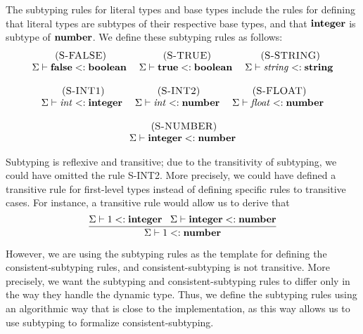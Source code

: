 The subtyping rules for literal types and base types include the rules
for defining that literal types are subtypes of their respective base types,
and that $\mathbf{integer}$ is subtype of $\mathbf{number}$.
We define these subtyping rules as follows:
\[
\begin{array}{c}
\begin{array}{c}
\; (\textsc{S-FALSE})\\
\Sigma \vdash \mathbf{false} <: \mathbf{boolean}
\end{array}
\;
\begin{array}{c}
\; (\textsc{S-TRUE})\\
\Sigma \vdash \mathbf{true} <: \mathbf{boolean}
\end{array}
\;
\begin{array}{c}
\; (\textsc{S-STRING})\\
\Sigma \vdash {\it string} <: \mathbf{string}
\end{array}
\\ \\
\begin{array}{c}
\; (\textsc{S-INT1})\\
\Sigma \vdash {\it int} <: \mathbf{integer}
\end{array}
\;
\begin{array}{c}
\; (\textsc{S-INT2})\\
\Sigma \vdash {\it int} <: \mathbf{number}
\end{array}
\;
\begin{array}{c}
\; (\textsc{S-FLOAT})\\
\Sigma \vdash {\it float} <: \mathbf{number}
\end{array}
\\ \\
\begin{array}{c}
\; (\textsc{S-NUMBER})\\
\Sigma \vdash \mathbf{integer} <: \mathbf{number}
\end{array}
\end{array}
\]

Subtyping is reflexive and transitive;
due to the transitivity of subtyping, we could have omitted the rule \textsc{S-INT2}.
More precisely, we could have defined a transitive rule for first-level
types instead of defining specific rules to transitive cases.
For instance, a transitive rule would allow us to derive that
\[
\dfrac{\Sigma \vdash 1 <: \mathbf{integer} \;\;\;
       \Sigma \vdash \mathbf{integer} <: \mathbf{number}}
      {\Sigma \vdash 1 <: \mathbf{number}}
\]

However, we are using the subtyping rules as the template for defining
the consistent-subtyping rules, and consistent-subtyping is not
transitive.
More precisely, we want the subtyping and consistent-subtyping rules
to differ only in the way they handle the dynamic type.
Thus, we define the subtyping rules using an algorithmic
way that is close to the implementation, as this way allows us to use
subtyping to formalize consistent-subtyping.

